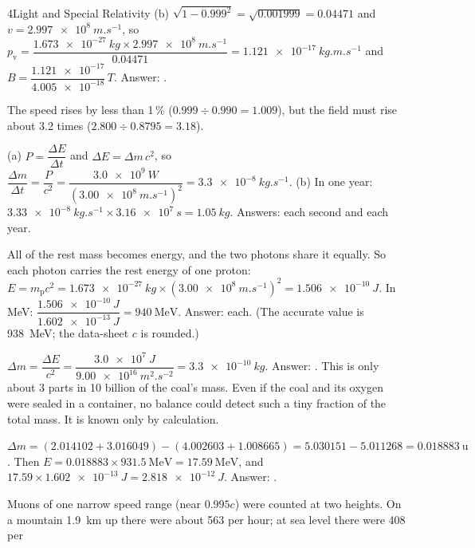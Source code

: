 \begin{chapteranswers}{4}{Light and Special Relativity}
        (b) $\sqrt{1 - 0.999^2} = \sqrt{0.001999} = 0.04471$ and
        $v = \qty{2.997e8}{m.s^{-1}}$, so
        $p_\mathrm{v} = \dfrac{\qty{1.673e-27}{kg} \times \qty{2.997e8}{m.s^{-1}}}{0.04471}
        = \qty{1.121e-17}{kg.m.s^{-1}}$ and
        $B = \dfrac{\num{1.121e-17}}{\num{4.005e-18}}\,\si{T}$. Answer:
        .\par
        The speed rises by less than 1\,\% ($0.999 \div 0.990 = 1.009$), but the field must
        rise about 3.2 times ($2.800 \div 0.8795 = 3.18$).
  \item (a) $P = \dfrac{\Delta E}{\Delta t}$ and $\Delta E = \Delta m\,c^2$, so
        $\dfrac{\Delta m}{\Delta t} = \dfrac{P}{c^2}
        = \dfrac{\qty{3.0e9}{W}}{(\qty{3.00e8}{m.s^{-1}})^2} = \qty{3.3e-8}{kg.s^{-1}}$.
        (b) In one year: $\qty{3.33e-8}{kg.s^{-1}} \times \qty{3.16e7}{s} = \qty{1.05}{kg}$.
        Answers:  each second and  each year.
  \item All of the rest mass becomes energy, and the two photons share it equally. So each
        photon carries the rest energy of one proton:
        $E = m_\mathrm{p}c^2 = \qty{1.673e-27}{kg} \times (\qty{3.00e8}{m.s^{-1}})^2
        = \qty{1.506e-10}{J}$. In MeV: $\dfrac{\qty{1.506e-10}{J}}{\qty{1.602e-13}{J}}
        = \qty{940}{\mega\eV}$. Answer:  each.
        (The accurate value is \qty{938}{\mega\eV}; the data-sheet $c$ is rounded.)
  \item $\Delta m = \dfrac{\Delta E}{c^2} = \dfrac{\qty{3.0e7}{J}}{\qty{9.00e16}{m^2.s^{-2}}}
        = \qty{3.3e-10}{kg}$. Answer: . This is only about 3 parts in
        10 billion of the coal's mass. Even if the coal and its oxygen were sealed in a container,
        no balance could detect such a tiny fraction of the total mass. It is known only by
        calculation.
  \item $\Delta m = (2.014102 + 3.016049) - (4.002603 + 1.008665) = 5.030151 - 5.011268
        = \qty{0.018883}{\amu}$. Then $E = 0.018883 \times \qty{931.5}{\mega\eV}
        = \qty{17.59}{\mega\eV}$, and $17.59 \times \qty{1.602e-13}{J} = \qty{2.818e-12}{J}$.
        Answer: .
  \item Muons of one narrow speed range (near $0.995c$) were counted at two heights. On a
        mountain \qty{1.9}{km} up there were about 563 per hour; at sea level there were 408 per

\end{chapteranswers}
